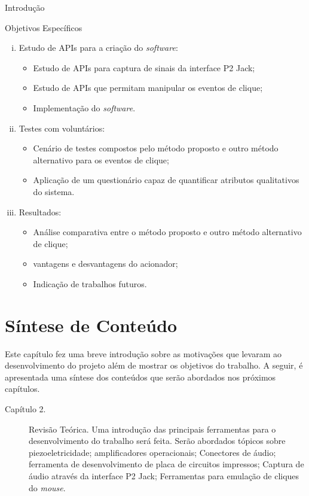 \begin{chapter}{Introdução}
\begin{subsection}{Objetivos Específicos}
\begin{enumerate}[i)]
	\item Estudo de APIs para a criação do \textit{software}: \vspace{-.2cm}
	\begin{itemize}
		\item Estudo de APIs para captura de sinais da interface P2 Jack;
		\item Estudo de APIs que permitam manipular os eventos de clique;
		\item Implementação do \textit{software}.
	\end{itemize}

	\item Testes com voluntários: \vspace{-.2cm}
	\begin{itemize}
		\item Cenário de testes compostos pelo método proposto e outro método alternativo para os eventos de clique;
		\item Aplicação de um questionário capaz de quantificar atributos qualitativos do sistema.
	\end{itemize}

	\item Resultados: \vspace{-.1cm}
	\begin{itemize}
		\item Análise comparativa entre o método proposto e outro método alternativo de clique;
		\item vantagens e desvantagens do acionador;
		\item Indicação de trabalhos futuros.
	\end{itemize}

\end{enumerate}

\end{subsection}

\section{Síntese de Conteúdo}

Este capítulo fez uma breve introdução sobre as motivações que levaram ao
desenvolvimento do projeto além de mostrar os objetivos do trabalho.
A seguir, é apresentada uma síntese dos conteúdos que serão abordados nos
próximos capítulos.

\begin{description}
	\item[Capítulo 2.] Revisão Teórica.
	Uma introdução das principais ferramentas para o desenvolvimento do trabalho
será feita. Serão abordados tópicos sobre piezoeletricidade; amplificadores
operacionais; Conectores de áudio; ferramenta de desenvolvimento de placa de
circuitos impressos; Captura de áudio através da interface P2 Jack; Ferramentas
para emulação de cliques do \textit{mouse}. 


\end{description}
\end{chapter}

